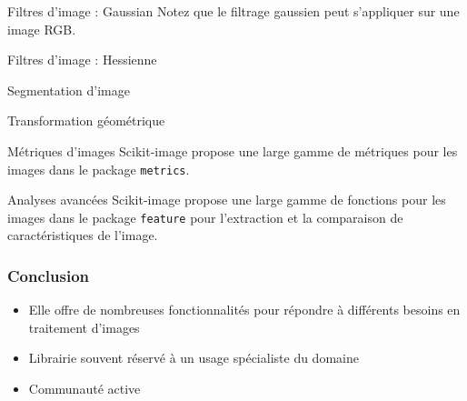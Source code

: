 \begin{frame}{Filtres d'image : Gaussian}
  Notez que le filtrage gaussien peut s'appliquer sur une image RGB.
\end{frame}
\begin{frame}{Filtres d'image : Hessienne}
\end{frame}

\begin{frame}{Segmentation d'image}
  
\end{frame}

\begin{frame}{Transformation géométrique}
  
\end{frame}

\begin{frame}{Métriques d'images}
  Scikit-image propose une large gamme de métriques pour les images dans le package \texttt{metrics}.
\end{frame}

\begin{frame}{Analyses avancées}
  Scikit-image propose une large gamme de fonctions pour les images dans le package \texttt{feature} pour l'extraction et la comparaison de caractéristiques de l'image.
\end{frame}

\begin{frame}
  \frametitle{Conclusion}
  \begin{itemize}
    \item Elle offre de nombreuses fonctionnalités pour répondre à différents besoins en traitement d'images
    \item Librairie souvent réservé à un usage spécialiste du domaine
    \item Communauté active
  \end{itemize}
\end{frame}